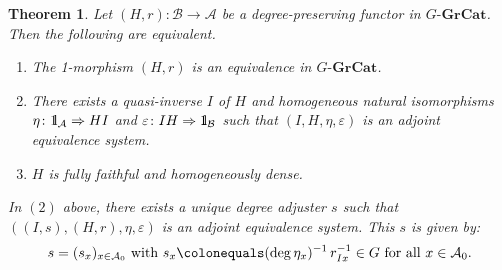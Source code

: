 \documentclass{surv-l}
\numberwithin{equation}{chapter}
\numberwithin{figure}{chapter}
\theoremstyle{plain}
\newtheorem{thm}{Theorem}[section]
\theoremstyle{definition}
\theoremstyle{remark}
\newcommand{\id}{1\kern-.25em{\text{{\rm l}}}}
\newcommand{\GGrCat}{G\text{-}\mathbf{GrCat}}
\begin{document}
\begin{thm}\label{eq-GrCat}
Let $(H,r) \colon\!\mathcal{B}\!\to\!\mathcal{A}$\! be a degree-preserving functor in
$\GGrCat$.
Then the following are equivalent.
\begin{enumerate}
\item
The 1-morphism $(H,r)$ is an equivalence in $\GGrCat$.
\item
There exists a quasi-inverse $I$ of $H$ and homogeneous natural isomorphisms
$\eta \colon \id_{\mathcal{A}} \Rightarrow HI$ and
$\varepsilon \colon IH \Rightarrow \id_{\mathcal{B}}$ such that
$(I, H, \eta, \varepsilon)$ is an adjoint equivalence system.
\item
$H$ is fully faithful and homogeneously dense.
\end{enumerate}
In $(2)$ above, there exists a unique degree adjuster $s$ such that
$((I, s), (H, r), \eta, \varepsilon)$ is an adjoint equivalence system.
This $s$ is given by:
\begin{equation}\label{dfn-deg-adj}
s = (s_x)_{x \in \mathcal{A}_0} \text{ with } s_x\colonequals  (\deg\eta_x)^{-1}\,r_{Ix}^{-1} \in G
\text{ for all }x \in \mathcal{A}_0.
\end{equation}
\end{thm}
\end{document}
